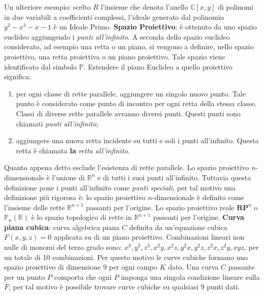\documentclass[a4paper,12pt]{tesiinfo}
\begin{document}
Un ulteriore esempio: scelto $R$ l'insieme che denota l'anello $\mathbb{C}[x, y]$ di polinomi in due variabili a coefficienti complessi, l'ideale generato dal polinomio $y^2 - x^3 -x -1$ \`e un Ideale Primo.    
\newline\newline
%
%
%
\textbf{Spazio Proiettivo}: \`e ottenuto da uno spazio euclideo aggiungendo i \textit{punti all'infinito}. A seconda dello spazio euclideo considerato, ad esempio una retta o un piano, si vengono a definire, nello spazio proiettivo, una retta proiettiva o un piano proiettivo. Tale spazio viene identificato dal simbolo $\mathbb{P}$.
\newline
Estendere il piano Euclideo a quello proiettivo significa:
\begin{enumerate}
    \item per ogni classe di rette parallele, aggiungere un singolo nuovo punto. Tale punto \`e considerato come punto di incontro per ogni retta della stessa classe. Classi di diverse rette parallele avranno diversi punti. Questi punti sono chiamati \textit{punti all'infinito};
    \item aggiungere una nuova retta incidente su tutti e soli i punti all'infinito. Questa retta \`e chiamata \textbf{la} \textit{retta all'infinito}.
\end{enumerate}
Quanto appena detto esclude l'esistenza di rette parallele.
\newline
Lo spazio proiettivo $n$-dimensionale \`e l'unione di $\mathbb{R}^n$ e di tutti i suoi punti all'infinito. Tuttavia questa definizione pone i punti all'infinito come \textit{punti speciali}, per tal motivo una definizione pi\`u rigorosa \`e: lo spazio proiettivo $n$-dimensionale \`e definito come l'insieme delle rette $\mathbb{R}^ {n+1}$ passanti per l'origine.
\newline
Lo spazio proiettivo reale $\textbf{RP}^n$ o $\mathbb{P}_n(\mathbb{R})$ \`e lo spazio topologico di rette in $\mathbb{R}^ {n+1}$ passanti per l'origine.
\newline\newline
%
%
%
\textbf{Curva piana cubica}: curva algebrica piana $C$ definita da un'equazione cubica $F(x, y, z) = 0$ applicata su di un piano proiettivo. Combinazioni lineari non nulle di monomi del terzo grado sono: $x^3, y^3, z^3, x^2y, x^2z, y^2x, y^2z, z^2x, z^2y, xyz$, per un totale di 10 combinazioni. Per questo motivo le curve cubiche formano uno spazio proiettivo di dimensione 9 per ogni campo $K$ dato.
Una curva $C$ passante per un punto $P$ comporta che ogni $P$ imponga una singola condizione lineare sulla $F$; per tal motivo \`e possibile trovare curve cubiche su qualsiasi 9 punti dati.
\end{document}
